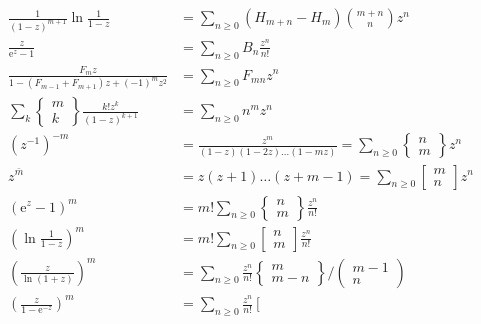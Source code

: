 \setcounter{equation}{42}
\begin{align}
    \frac{1}{(1-z)^{m+1}} \ln \frac{1}{1-z} &=\sum_{n \geqslant 0}\left(H_{m+n}-H_{m}\right){m+n  \choose n} z^{n} \\
    \frac{z}{\mathrm{e}^{z}-1} &=\sum_{n \geqslant 0} B_{n} \frac{z^{n}}{n !} \\
    \frac{F_{m} z}{1-\left(F_{m-1}+F_{m+1}\right) z+(-1)^{m} z^{2}} &=\sum_{n \geqslant 0} F_{m n} z^{n} \\
    \sum_{k}\left\{\begin{array}{c}
    m \\
    k
    \end{array}\right\} \frac{k ! z^{k}}{(1-z)^{k+1}} &=\sum_{n \geqslant 0} n^{m} z^{n}\\
    \left(z^{-1}\right)^{-m} &=\frac{z^{m}}{(1-z)(1-2 z) \ldots(1-m z)}=\sum_{n \geqslant 0}\left\{\begin{array}{l}
    n \\
    m
    \end{array}\right\} z^{n} \\
    z^{\bar{m}} &=z(z+1) \ldots(z+m-1)=\sum_{n \geqslant 0}\left[\begin{array}{l}
    m \\
    n
    \end{array}\right] z^{n} \\
    \left(\mathrm{e}^{z}-1\right)^{m} &=m ! \sum_{n \geqslant 0}\left\{\begin{array}{l}
    n \\
    m
    \end{array}\right\} \frac{z^{n}}{n !} \\
    \left(\ln \frac{1}{1-z}\right)^{m} &=m ! \sum_{n \geqslant 0}\left[\begin{array}{l}
    n \\
    m
    \end{array}\right] \frac{z^{n}}{n !}\\
    \left(\frac{z}{\ln (1+z)}\right)^{m} &=\sum_{n \geqslant 0} \frac{z^{n}}{n !}\left\{\begin{array}{c}
    m \\
    m-n
    \end{array}\right\} /\left(\begin{array}{c}
    m-1 \\
    n
    \end{array}\right) \\
    \left(\frac{z}{1-\mathrm{e}^{-z}}\right)^{m} &=\sum_{n \geqslant 0} \frac{z^{n}}{n !}\left[\begin{array}{c}

\end{array}
\end{align}
